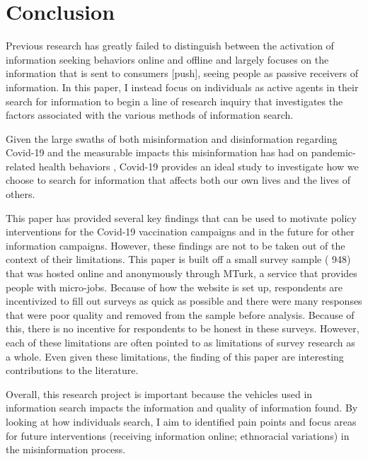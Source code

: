 \hypertarget{conclusion}{%
\section{Conclusion}\label{conclusion}}

Previous research has greatly failed to distinguish between the activation of
information seeking behaviors online and offline and largely focuses on the
information that is sent to consumers {[}push{]}, seeing people as passive receivers
of information. In this paper, I instead focus on individuals as active agents
in their search for information to begin a line of research inquiry that
investigates the factors associated with the various methods of information
search.

Given the large swaths of both misinformation and disinformation regarding
Covid-19 \citep{pathakInfodemicsCOVID19Role2020, mottaHowRightLeaningMedia2020, shahsavariConspiracyTimeCorona2020} and the measurable impacts this misinformation has had on pandemic-related health behaviors
\citep{loombaMeasuringImpactCOVID192021, greene_murphy21}, Covid-19 provides an ideal study to
investigate how we choose to search for information that affects both our own
lives and the lives of others.

This paper has provided several key findings that can be used to motivate policy
interventions for the Covid-19 vaccination campaigns and in the future for other
information campaigns. However, these findings are not to be taken out of the
context of their limitations. This paper is built off a small survey sample (
948) that was hosted online and anonymously through MTurk, a service
that provides people with micro-jobs. Because of how the website is set up,
respondents are incentivized to fill out surveys as quick as possible and there
were many responses that were poor quality and removed from the sample before
analysis. Because of this, there is no incentive for respondents to be honest in
these surveys. However, each of these limitations are often pointed to as
limitations of survey research as a whole. Even given these limitations,
the finding of this paper are interesting contributions to the literature.

Overall, this research project is important because the vehicles used in
information search impacts the information and quality of information found. By
looking at how individuals search, I aim to identified pain points and focus areas
for future interventions (receiving information online; ethnoracial variations) in the misinformation process.